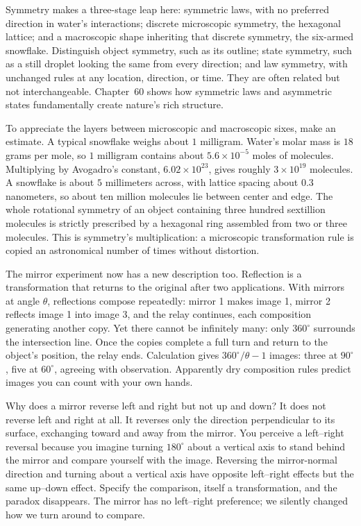 Symmetry makes a three-stage leap here: symmetric laws, with no preferred direction in water's interactions; discrete microscopic symmetry, the hexagonal lattice; and a macroscopic shape inheriting that discrete symmetry, the six-armed snowflake. Distinguish object symmetry, such as its outline; state symmetry, such as a still droplet looking the same from every direction; and law symmetry, with unchanged rules at any location, direction, or time. They are often related but not interchangeable. Chapter~60 shows how symmetric laws and asymmetric states fundamentally create nature's rich structure.

To appreciate the layers between microscopic and macroscopic sixes, make an estimate. A typical snowflake weighs about \(1\) milligram. Water's molar mass is \(18\) grams per mole, so \(1\) milligram contains about \(5.6\times10^{-5}\) moles of molecules. Multiplying by Avogadro's constant, \(6.02\times10^{23}\), gives roughly \(3\times10^{19}\) molecules. A snowflake is about \(5\) millimeters across, with lattice spacing about \(0.3\) nanometers, so about ten million molecules lie between center and edge. The whole rotational symmetry of an object containing three hundred sextillion molecules is strictly prescribed by a hexagonal ring assembled from two or three molecules. This is symmetry's multiplication: a microscopic transformation rule is copied an astronomical number of times without distortion.

The mirror experiment now has a new description too. Reflection is a transformation that returns to the original after two applications. With mirrors at angle \(\theta\), reflections compose repeatedly: mirror 1 makes image 1, mirror 2 reflects image 1 into image 3, and the relay continues, each composition generating another copy. Yet there cannot be infinitely many: only \(360^\circ\) surrounds the intersection line. Once the copies complete a full turn and return to the object's position, the relay ends. Calculation gives \(360^\circ/\theta-1\) images: three at \(90^\circ\), five at \(60^\circ\), agreeing with observation. Apparently dry composition rules predict images you can count with your own hands.

Why does a mirror reverse left and right but not up and down? It does not reverse left and right at all. It reverses only the direction perpendicular to its surface, exchanging toward and away from the mirror. You perceive a left--right reversal because you imagine turning \(180^\circ\) about a vertical axis to stand behind the mirror and compare yourself with the image. Reversing the mirror-normal direction and turning about a vertical axis have opposite left--right effects but the same up--down effect. Specify the comparison, itself a transformation, and the paradox disappears. The mirror has no left--right preference; we silently changed how we turn around to compare.

